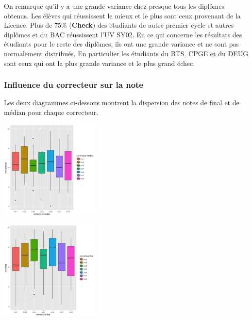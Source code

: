 \documentclass[10pt]{article}
\begin{document}
	On remarque qu'il y a une grande variance chez presque tous les diplômes obtenus. Les élèves qui réussissent le mieux et le plus sont ceux provenant de la Licence.  Plus de 75\%  (\textbf{Check}) des etudiants de autre premier  cycle et autres diplômes et du BAC réussissent l'UV SY02. En ce qui concerne les résultats des étudiants pour le reste des diplômes, ils ont une grande variance et ne sont pas normalement distribués. En particulier les étudiants du BTS, CPGE et du DEUG sont ceux qui ont la plus grande variance et le plus grand échec.
	
	
	\subsubsection{Influence du correcteur sur la note}
	
	\begin{minipage}{\linewidth}
		Les deux diagrammes ci-dessous montrent la dispersion des notes de final et de médian pour chaque correcteur.\\
		\begin{minipage}{0.50\linewidth}
			\includegraphics[width=50mm]{Figures/Notes/correcteur_median.png}
			\label{fig:scatter_correcteur_median}
		\end{minipage}
		\hspace{0.01\linewidth}
		\begin{minipage}{0.50\linewidth}	
			\includegraphics[width=50mm]{Figures/Notes/correcteur_final.png}
			\label{fig:scatter_correcteur_median}
		\end{minipage}
	\end{minipage}
\end{document}

